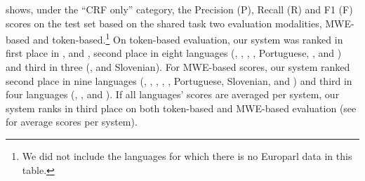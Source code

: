 \documentclass[output=paper,modfonts,nonflat]{langsci/langscibook}
\begin{document}
 shows, under the ``CRF only'' category, the Precision (P), Recall (R) and F1 (F) scores on the test set based on the shared task two evaluation modalities, MWE-based and token-based.\footnote{We did not include the languages for which there is no
  Europarl data in this table.} On token-based evaluation, our system was ranked in first place in ,  and , second place in eight languages (, , , , Portuguese, ,  and ) and third in three (,  and Slovenian). For MWE-based scores, our system ranked second place in nine languages (, , , , , Portuguese, Slovenian,  and ) and third in four languages (, ,  and ). If all languages' scores are averaged per system, our system ranks in third place on both token-based and MWE-based evaluation (see  for average scores per system).
\end{document}
